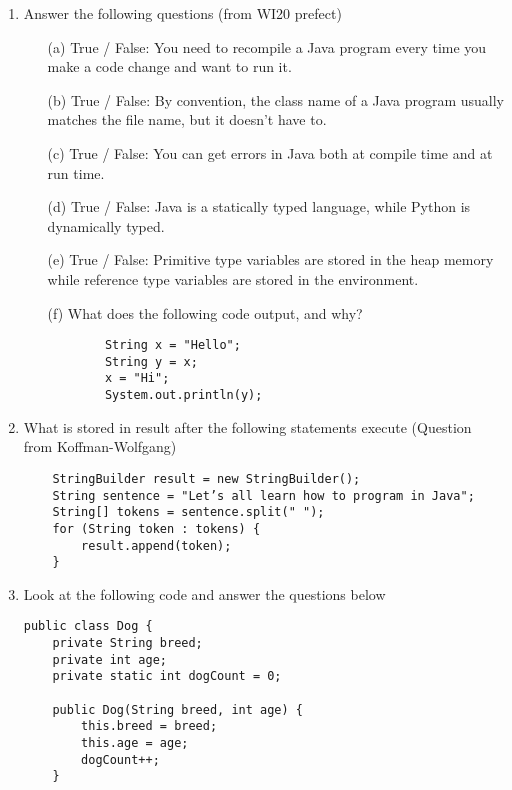 \documentclass[letter]{article}
\def\coursename{CS 201: Data Structures}
\newcommand{\header}[1]{%
	\begin{center}
		\fbox{
			\begin{minipage}{6in}
				\textbf{\coursename} \hfill       \\
				\textit{#1} \hfill \textit{\today}
			\end{minipage}
		}
	\end{center}
	\vspace*{4mm}
}
\begin{document}
\header{Week 1}

\begin{enumerate}[1.] 
    \item Answer the following questions (from WI20 prefect)
    \begin{itemize}
        \item [(a)] True / False: You need to recompile a Java program every time you make a code change and want to run it. 
        \item [(b)] True / False: By convention, the class name of a Java program usually matches the file name, but it doesn't have to.
        \item [(c)] True / False: You can get errors in Java both at compile time and at run time.
        \item [(d)] True / False: Java is a statically typed language, while Python is dynamically typed.
        \item [(e)] True / False: Primitive type variables are stored in the heap memory while reference type variables are stored in the environment.
        \item [(f)] What does the following code output, and why?
        \begin{verbatim}
        String x = "Hello";
        String y = x;
        x = "Hi";
        System.out.println(y);
        \end{verbatim}
    \end{itemize}

    
    \item What is stored in result after the following statements execute (Question from Koffman-Wolfgang)
    \begin{verbatim}
    StringBuilder result = new StringBuilder();
    String sentence = "Let’s all learn how to program in Java";
    String[] tokens = sentence.split(" ");
    for (String token : tokens) {
        result.append(token);
    }
    \end{verbatim}
        
    \item Look at the following code and answer the questions below

    \lstset{language=Java, 
        basicstyle=\ttfamily\small, 
        showstringspaces=false,
	numbers=left,
	frame=single,
	tabsize=4,
	commentstyle=,
}
    \begin{lstlisting}
public class Dog {
    private String breed;
    private int age;
    private static int dogCount = 0;

    public Dog(String breed, int age) {
        this.breed = breed;
        this.age = age;
        dogCount++;
    }


\end{lstlisting}
\end{enumerate}
\end{document}
